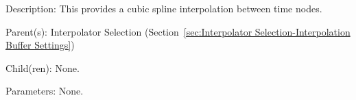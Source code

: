 \begin{list}{}
  {\setlength{\leftmargin}{1.0in}
   \setlength{\labelwidth}{0.75in}
   \setlength{\labelsep}{0.125in}}
  \item[Description:]
    This provides a cubic spline interpolation between time nodes.
  \item[Parent(s):]
    Interpolator Selection (Section~\ref{sec:Interpolator Selection-Interpolation Buffer Settings})
  \item[Child(ren):]
    None. 
  \item[Parameters:]
    None. 
\end{list}
